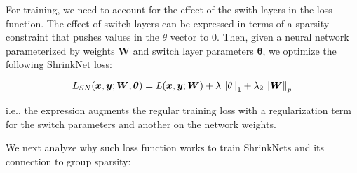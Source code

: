 For training, we need to account for the effect of the swith layers in the loss
function. The effect of switch layers can be expressed in terms of a sparsity constraint
that pushes values in the $\theta$ vector to 0. Then, given a neural network
parameterized by weights $\bm{W}$ and switch layer parameters $\bm{\theta}$, we
optimize the following ShrinkNet loss:

\begin{equation}
  L_{SN}(\bm{x},\bm{y};\bm{W}, \bm{\theta}) = L(\bm{x}, \bm{y}; \bm{W}) +
  \lambda\left\lVert\theta\right\rVert_1 + \lambda_2\left\lVert\bm{W}\right\rVert_p
\end{equation}

i.e., the expression augments the regular training loss with a regularization
term for the switch parameters and another on the network weights.

We next analyze why such loss function works to train ShrinkNets and its
connection to group sparsity:






